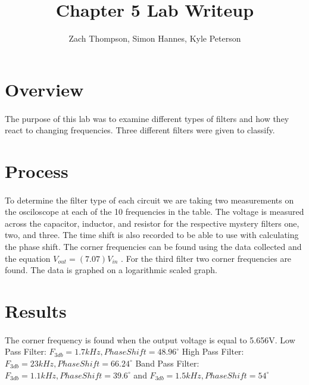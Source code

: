 \documentclass{article}
\title{Chapter 5 Lab Writeup}
\author{Zach Thompson, Simon Hannes, Kyle Peterson}
\begin{document}
\maketitle{}

\section*{Overview}
\paragraph{}
The purpose of this lab was to examine different types of filters and how they react to changing frequencies.
Three different filters were given to classify.



\section*{Process}
\paragraph{}
To determine the filter type of each circuit we are taking two measurements on the osciloscope at each of the 
10 frequencies in the table. The voltage is measured across the capacitor, inductor, and resistor for the 
respective mystery filters one, two, and three. The time shift is also recorded to be able to use with 
calculating the phase shift. The corner frequencies can be found using the data collected and the equation 
$ V_{out} = (7.07)   V_{in}$ . For the third filter two corner frequencies are found. The data is graphed on 
a logarithmic scaled graph.

\section*{Results}
\paragraph{}
The corner frequency is found when the output voltage is equal to 5.656V.
\newline
Low Pass Filter: $F_{3db} = 1.7kHz, Phase Shift = 48.96^{\circ}$
\newline
High Pass Filter: $F_{3db} = 23kHz, Phase Shift = 66.24^{\circ}$
\newline
Band Pass Filter: $F_{3db} = 1.1kHz, Phase Shift = 39.6^{\circ}$
and $F_{3db} = 1.5kHz, Phase Shift = 54^{\circ}$
\end{document}
